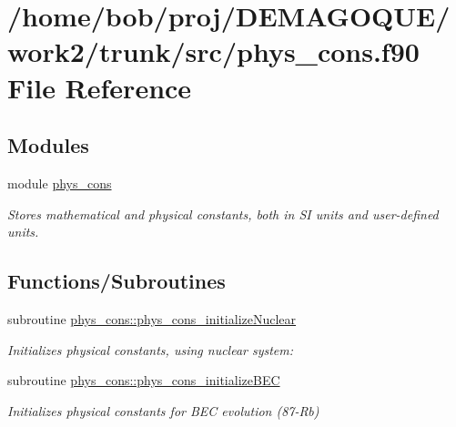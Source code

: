 \hypertarget{phys__cons_8f90}{
\section{/home/bob/proj/DEMAGOQUE/work2/trunk/src/phys\_\-cons.f90 File Reference}
\label{phys__cons_8f90}
}
\subsection*{Modules}
\begin{DoxyCompactItemize}
\item 
module \hyperlink{namespacephys__cons}{phys\_\-cons}


\begin{DoxyCompactList}\small\item\em Stores mathematical and physical constants, both in SI units and user-\/defined units. \item\end{DoxyCompactList}

\end{DoxyCompactItemize}
\subsection*{Functions/Subroutines}
\begin{DoxyCompactItemize}
\item 
subroutine \hyperlink{namespacephys__cons_ab13f84d8b6f574eb73870a2964a82b8b}{phys\_\-cons::phys\_\-cons\_\-initializeNuclear}
\begin{DoxyCompactList}\small\item\em Initializes physical constants, using nuclear system: \item\end{DoxyCompactList}\item 
subroutine \hyperlink{namespacephys__cons_ae56f25b6648518608cb32e16cfce196e}{phys\_\-cons::phys\_\-cons\_\-initializeBEC}
\begin{DoxyCompactList}\small\item\em Initializes physical constants for BEC evolution (87-\/Rb) \item\end{DoxyCompactList}\end{DoxyCompactItemize}

